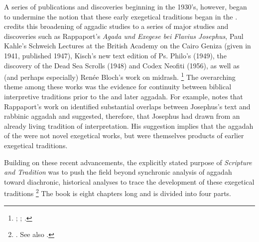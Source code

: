 A series of publications and discoveries beginning in the 1930's, however, began to undermine the notion that these early exegetical traditions began in the . \vermes credits this broadening of aggadic studies to a series of major studies and discoveries such as Rappaport's \emph{Agada und Exegese bei Flavius Josephus},%
    \autocite{rappaport1930}
Paul Kahle's Schweich Lectures at the British Academy on the Cairo Geniza (given in 1941, published 1947),%
    \autocite{kahle1947}
Kisch's new text edition of Ps. Philo's \lab (1949),%
    \autocite{kisch1949}
the discovery of the Dead Sea Scrolls (1948) and Codex Neofiti (1956), as well as (and perhaps especially) Renée Bloch's work on midrash.%
    \footnote{%
        \Cite{bloch1954};
        \cite{bloch1955_repr};
        \cite[3--7]{vermes1961}.}
The overarching theme among these works was the evidence for continuity between biblical interpretive traditions prior to the  and later aggadah. For example, \vermes notes that Rappaport's work on \antiquities identified substantial overlaps between Josephus's text and rabbinic aggadah and suggested, therefore, that Josephus had drawn from an already living tradition of interpretation. His suggestion implies that the aggadah of the  were not novel exegetical works, but were themselves products of earlier exegetical traditions. 

Building on these recent advancements, the explicitly stated purpose of \emph{Scripture and Tradition} was to push the field beyond synchronic analysis of aggadah toward diachronic, historical analyses to trace the development of these exegetical traditions%
    \footnote{%
        \Cite[1]{vermes1961}. See also
        \cite{bloch1955_repr}.}
The book is eight chapters long and is divided into four parts. 

